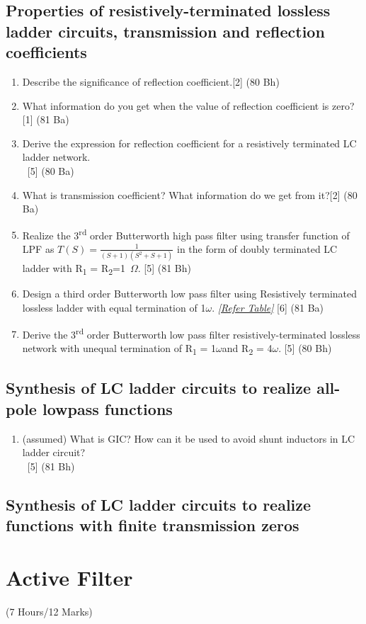 \documentclass[12pt]{article}
\newcommand{\w}{\(\omega\)}
\newcommand{\enter}{\\\textcolor{white}{1}}
\begin{document}
\subsection{Properties of resistively-terminated lossless ladder circuits, transmission and reflection coefficients}
\begin{enumerate}
\item Describe the significance of reflection coefficient.\hfill [2] (80 Bh)
\item What information do you get when the value of reflection coefficient is zero?\hfill [1] (81 Ba)
\item Derive the expression for reflection coefficient for a resistively terminated LC ladder network.
\enter\hfill [5] (80 Ba)
\item What is transmission coefficient? What information do we get from it?\hfill[2] (80 Ba)
\item Realize the 3\textsuperscript{rd} order Butterworth high pass filter using transfer function of LPF as $T(S)= \frac{1}{(S+1)(S^2+S+1)}$ in the form of doubly terminated LC ladder with R\textsubscript{1} = R\textsubscript{2}=1~$\Omega$. \hfill [5] (81 Bh)
\item Design a third order Butterworth low pass filter using Resistively terminated lossless ladder with equal termination of 1\w. \textit{[\hyperref[sec:tables_81ba]{Refer Table]}} \hfill [6] (81 Ba)
\item Derive the 3\textsuperscript{rd} order Butterworth low pass filter resistively-terminated lossless network with unequal termination of R\textsubscript{1} = 1\w and R\textsubscript{2} = 4\w.	\hfill [5] (80 Bh)
\end{enumerate}
\subsection{Synthesis of LC ladder circuits to realize all-pole lowpass functions}
\begin{enumerate}
\item (assumed) What is GIC? How can it be used to avoid shunt inductors in LC ladder circuit?
\enter \hfill [5] (81 Bh)
\end{enumerate}
\subsection{Synthesis of LC ladder circuits to realize functions with finite transmission zeros}

\pagebreak
\section{Active Filter}
\begin{center}(7 Hours/12 Marks)\end{center}
\end{document}
